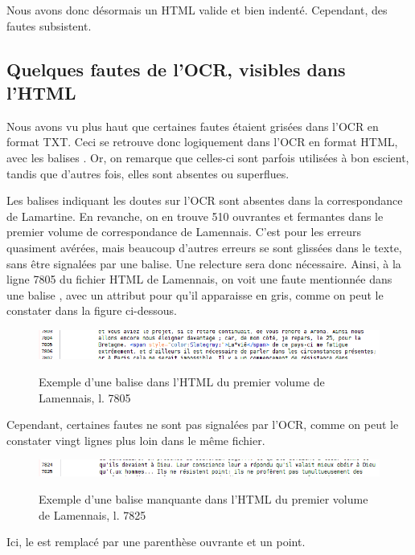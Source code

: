 Nous avons donc désormais un HTML valide et bien indenté. Cependant, des fautes subsistent.

\subsection{Quelques fautes de l'OCR, visibles dans l'HTML}

Nous avons vu plus haut que certaines fautes étaient grisées dans l'OCR en format TXT. Ceci se retrouve donc logiquement dans l'OCR en format HTML, avec les balises . Or, on remarque que celles-ci sont parfois utilisées à bon escient, tandis que d'autres fois, elles sont absentes ou superflues.

Les balises  indiquant les doutes sur l’OCR sont absentes dans la correspondance de Lamartine. En revanche, on en trouve 510 ouvrantes et fermantes dans le premier volume de correspondance de Lamennais. C'est pour les erreurs quasiment avérées, mais beaucoup d’autres erreurs se sont glissées dans le texte, sans être signalées par une balise.  Une relecture sera donc nécessaire. 
Ainsi, à la ligne 7805 du fichier HTML de Lamennais, on voit une faute mentionnée dans une balise , avec un attribut  pour qu'il apparaisse en gris, comme on peut le constater dans la figure ci-dessous.

\begin{figure}[ht]
    \centering
    \caption{Exemple d'une balise  dans l'HTML du premier volume de Lamennais, l. 7805}
    \includegraphics[width=16cm]{images/span_lamennais_7805.png}
    \label{span_lamennais_7805}
\end{figure}

Cependant, certaines fautes ne sont pas signalées par l'OCR, comme on peut le constater vingt lignes plus loin dans le même fichier.

\begin{figure}[ht]
    \centering
    \caption{Exemple d'une balise  manquante dans l'HTML du premier volume de Lamennais, l. 7825}
    \includegraphics[width=16cm]{images/sans_span_lamennais.png}
    \label{sans_span_lamennais}
\end{figure}
Ici, le  est remplacé par une parenthèse ouvrante et un point. 


